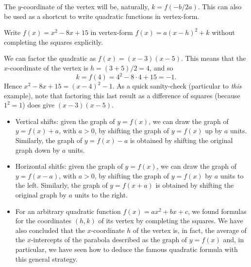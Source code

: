 \documentclass[handout, noauthor, nooutcomes]{ximera}
\begin{document}
The $y$-coordinate of the vertex will be, naturally, $k = f(-b/2a)$. This can also be used as a shortcut to write quadratic functions in vertex-form.

\begin{example}
  Write $f(x) = x^2 - 8x+15$ in vertex-form $f(x) = a(x-h)^2+k$ without completing the squares explicitly.\\[.5em]
  \begin{explanation}
    We can factor the quadratic as $f(x) = (x-3)(x-5)$. This means that the $x$-coordinate of the vertex is $h = (3+5)/2 = 4$, and so $$k =f(4) = 4^2-8\cdot 4 + 15 = -1.$$Hence $x^2-8x+15 = (x-4)^2-1$. As a quick sanity-check (particular to \emph{this} example), note that factoring this last result as a difference of squares (because $1^2=1$) does give $(x-3)(x-5)$.
  \end{explanation}
\end{example}


\begin{summary}\begin{itemize}
\item Vertical shifts: given the graph of $y=f(x)$, we can draw the graph of $y=f(x)+a$, with $a>0$, by shifting the graph of $y=f(x)$ up by $a$ units. Similarly, the graph of $y=f(x)-a$ is obtained by shifting the original graph down by $a$ units.
\item Horizontal shitfs: given the graph of $y=f(x)$, we can draw the graph of $y=f(x-a)$, with $a>0$, by shifting the graph of $y=f(x)$ by $a$ units to the left. Similarly, the graph of $y=f(x+a)$ is obtained by shifting the original graph by $a$ units to the right.
\item For an arbitrary quadratic function $f(x) = ax^2+bx+c$, we found formulas for the coordinates $(h,k)$ of its vertex by completing the squares. We have also concluded that the $x$-coordinate $h$ of the vertex is, in fact, the average of the $x$-intercepts of the parabola described as the graph of $y=f(x)$ and, in particular, we have seen how to deduce the famous quadratic formula with this general strategy.
\end{itemize}\end{summary}
\end{document}
